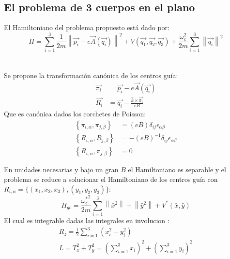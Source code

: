 \documentclass[xcolor=dvipsnames]{beamer}
\newcommand{\norm}[1]{\left\lVert #1 \right\rVert}
\newcommand{\roundP}[1]{\left( #1 \right)}
\newcommand{\poisson}[2]{\left\lbrace #1, #2 \right\rbrace}
\begin{document}
\subsection{El problema de 3 cuerpos en el plano}
\begin{frame}
El Hamiltoniano del problema propuesto está dado por:
\begin{equation*}
H = \sum_{i=1}^{3} \frac{1}{2m} \norm{ \vec{p_i} - 
e\vec{ A } \left( \vec{q_i} \right)}^2
+ V \roundP{ \vec{q_1},\vec{q_2},\vec{q_3} }
+\frac{\omega_c^2}{2m}\sum_{i=1}^{3} \norm{\vec{q_i}}^2
\end{equation*}
\\~\\
Se propone la transformación canónica de los centros guía:
\begin{align*}
\vec{\pi_i} &= \vec{p_i} - e\vec{A}\roundP{\vec{q_i}}\\
\vec{R_i} &= \vec{q_i} - \frac{\hat{k}\times\vec{\pi_i}}{eB}
\end{align*}
Que es canónica dados los corchetes de Poisson:
\begin{align*}
\poisson{\pi_{i,\alpha}}{\pi_{j,\beta}}&=\roundP{eB}\delta_{ij}\epsilon_{\alpha \beta}\\  
\poisson{R_{i,\alpha}}{R_{j,\beta}}&= -\roundP{eB}^{-1} \delta_{ij}\epsilon_{\alpha \beta}\\  
\poisson{R_{i,\alpha}}{\pi_{j,\beta}}&=0
\end{align*}
\end{frame}
\begin{frame}
En unidades necesarias y bajo un gran $B$ el Hamiltoniano es separable y el problema se reduce a solucionar el Hamiltoniano de los centros guía con $R_{i,\alpha} = \{(x_1,x_2,x_3),(y_1,y_2,y_3)\}$:
\begin{equation*}
H_{gc} = \frac{{\omega_c^*}^2}{2m} \sum_{i=1}^{3} \norm{\bar{x}^2} + \norm{\bar{y}^2}
+ V^*\roundP{\bar{x},\bar{y}}
\end{equation*}
El cual es integrable dadas las integrales en involucion \cite{scheck}:
\begin{align*}
R_z = \frac{1}{2} \sum_{i=1}^{3} \roundP{x_i^2 + y_i^2}\\
L = T_x^2 + T_y^2 = \roundP{\sum_{i=1}^{3} x_i}^2 + \roundP{\sum_{i=1}^{3} y_i}^2\\
\end{align*}
\end{frame}
\end{document}
